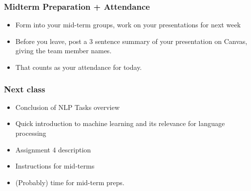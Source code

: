 \documentclass{beamer}
\begin{document}
\begin{frame}
\frametitle{Midterm Preparation + Attendance}
\begin{itemize}
\item Form into your mid-term groups, work on your presentations for next week
\item Before you leave, post a 3 sentence summary of your presentation on Canvas, giving the team member names.  
\item That counts as your attendance for today.
\end{itemize}
\end{frame}

\begin{frame}
\frametitle{Next class}
\begin{itemize}
\item Conclusion of NLP Tasks overview
\item Quick introduction to machine learning and its relevance for language processing
\item Assignment 4 description
\item Instructions for mid-terms
\item (Probably) time for mid-term preps. 
\end{itemize}
\end{frame}
\end{document}
